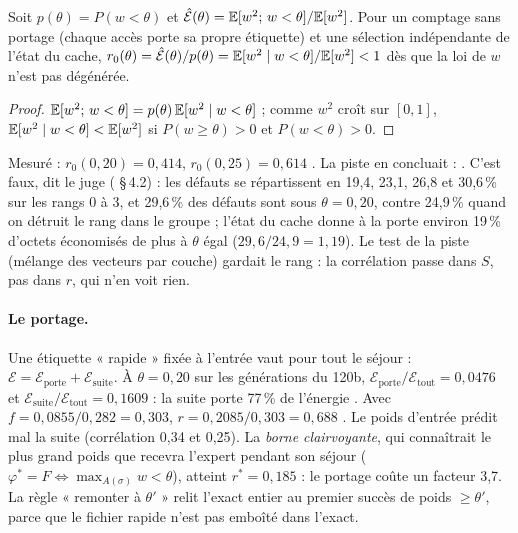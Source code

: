 \begin{proposition}\label{t3mim:prop:p6-porte}
Soit $p(\theta) = P(w < \theta)$ et $\hat{\mathcal E}(\theta) = \mathbb{E}[w^2 ;\, w < \theta] / \mathbb{E}[w^2]$. Pour un comptage sans portage (chaque accès porte sa propre étiquette) et une sélection indépendante de l'état du cache, $r_0(\theta) = \hat{\mathcal E}(\theta)/p(\theta) = \mathbb{E}[w^2 \mid w < \theta]/\mathbb{E}[w^2] < 1$ dès que la loi de $w$ n'est pas dégénérée.
\end{proposition}
\begin{proof}
$\mathbb{E}[w^2;\, w<\theta] = p(\theta)\,\mathbb{E}[w^2 \mid w < \theta]$ ; comme $w^2$ croît sur $[0, 1]$, $\mathbb{E}[w^2 \mid w < \theta] < \mathbb{E}[w^2]$ si $P(w \ge \theta) > 0$ et $P(w<\theta)>0$.
\end{proof}
Mesuré : $r_0(0{,}20) = 0{,}414$, $r_0(0{,}25) = 0{,}614$ \mes. La piste en concluait : . C'est faux, dit le juge ( §\,4.2) : les défauts se répartissent en 19,4, 23,1, 26,8 et 30,6\,\% sur les rangs 0 à 3, et 29,6\,\% des défauts sont sous $\theta = 0{,}20$, contre 24,9\,\% quand on détruit le rang dans le groupe ; l'état du cache donne à la porte environ 19\,\% d'octets économisés de plus à $\theta$ égal ($29{,}6/24{,}9 = 1{,}19$). Le test de la piste (mélange des vecteurs par couche) gardait le rang : la corrélation passe dans $S$, pas dans $r$, qui n'en voit rien.

\paragraph{Le portage.} Une étiquette « rapide » fixée à l'entrée vaut pour tout le séjour : $\mathcal E = \mathcal E_{\text{porte}} + \mathcal E_{\text{suite}}$. À $\theta = 0{,}20$ sur les générations du 120b, $\mathcal E_{\text{porte}}/\mathcal E_{\text{tout}} = 0{,}0476$ et $\mathcal E_{\text{suite}}/\mathcal E_{\text{tout}} = 0{,}1609$ : la suite porte 77\,\% de l'énergie \mes. Avec $f = 0{,}0855/0{,}282 = 0{,}303$, $r = 0{,}2085/0{,}303 = 0{,}688$ \calc. Le poids d'entrée prédit mal la suite (corrélation 0,34 et 0,25). La \emph{borne clairvoyante}, qui connaîtrait le plus grand poids que recevra l'expert pendant son séjour ($\varphi^\ast = F \iff \max_{A(\sigma)} w < \theta$), atteint $r^\ast = 0{,}185$ : le portage coûte un facteur 3,7. La règle « remonter à $\theta'$ » relit l'exact entier au premier succès de poids $\ge \theta'$, parce que le fichier rapide n'est pas emboîté dans l'exact.

